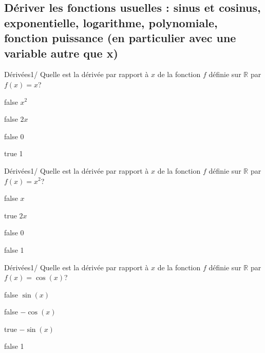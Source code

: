 \documentclass[11pt]{article}
\begin{document}
        \subsection{Dériver les fonctions usuelles : sinus et cosinus, exponentielle, logarithme, polynomiale, fonction puissance  (en particulier avec une variable autre que x)}
        
        	\begin{question}{22}{Dérivées}{1}{/}
				Quelle est la dérivée par rapport à $x$ de la fonction $f$ définie sur $\mathbb{R}$ par $f(x)=x$?
            \end{question}

            \begin{reponses}
            	\item[false] $x^2$
            	\item[false] $2x$
                \item[false] 0
                \item[true] 1
            \end{reponses}
        
        	\begin{question}{22}{Dérivées}{1}{/}
				Quelle est la dérivée par rapport à $x$ de la fonction $f$ définie sur $\mathbb{R}$ par $f(x)=x^2$?
            \end{question}

            \begin{reponses}
            	\item[false] $x$
            	\item[true] $2x$
                \item[false] 0
                \item[false] 1
            \end{reponses}
        
        	\begin{question}{22}{Dérivées}{1}{/}
				Quelle est la dérivée par rapport à $x$ de la fonction $f$ définie sur $\mathbb{R}$ par $f(x)=\cos(x)$?
            \end{question}

            \begin{reponses}
            	\item[false] $\sin(x)$
            	\item[false] $-\cos(x)$
                \item[true] $-\sin(x)$
                \item[false] 1
            \end{reponses}
        
\end{document}
